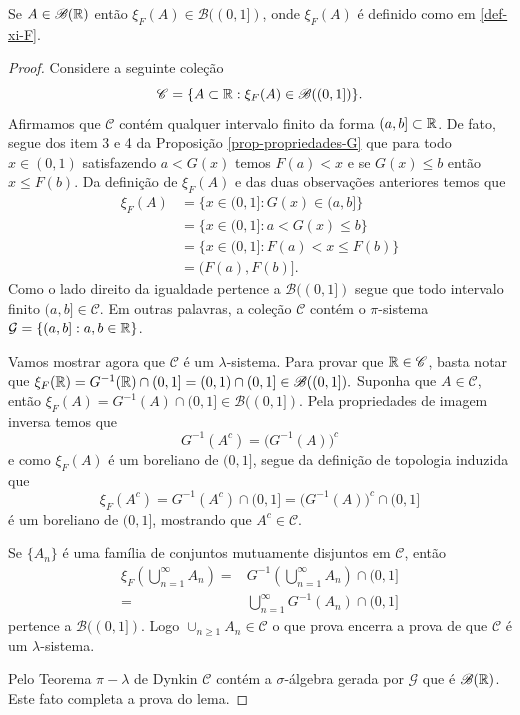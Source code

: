 \begin{lema}
	Se $A\in\mathscr{B}(\mathbb{R})$ então $\xi_F(A) \in\mathscr{B}((0,1])$, onde
	$\xi_F(A)$ é definido como em \eqref{def-xi-F}.
\end{lema}



\begin{proof}
Considere a seguinte coleção 
	\[
		\mathscr{C} 
		=
		\{ A\subset\mathbb{R}: \xi_F(A) \in \mathscr{B}((0,1])\}.
	\]
Afirmamos que $\mathscr{C}$ contém qualquer intervalo finito da forma
$(a,b]\subset \mathbb{R}$. De fato, segue dos item 3 e 4 
da Proposição \ref{prop-propriedades-G} que 
para todo $x\in (0,1)$ satisfazendo 
$a<G(x)$ temos $F(a)<x$ e se $G(x)\leq b$ então 
$x\leq F(b)$. Da definição de $\xi_{F}(A)$ e 
das duas observações anteriores temos que
%
%
\begin{align*}
	\xi_F(A) 
	&= 
	\{ x\in (0,1]: G(x) \in (a,b] \}
	\\
	&=	
	\{ x\in (0,1]: a<G(x)\leq b  \}
	\\
	&=
	\{ x\in (0,1]:F(a) <x \leq F(b) \}
	\\
	&=
	(F(a),F(b)].
\end{align*}
Como o lado direito da igualdade pertence a $\mathscr{B}((0,1])$
segue que todo intervalo finito $(a,b]\in \mathscr{C}$.
Em outras palavras, a coleção $\mathscr{C}$ 
contém o $\pi$-sistema $\mathcal{G}=\{ (a,b]: a,b\in\mathbb{R}\}$.


Vamos mostrar agora que $\mathscr{C}$ é um $\lambda$-sistema. 
Para provar que $\mathbb{R}\in \mathscr{C}$, basta 
notar que
$
	\xi_F(\mathbb{R})
	= G^{-1}(\mathbb{R})\cap (0,1] 
	= (0,1)\cap (0,1]
	\in \mathscr{B}((0,1]). 
$
Suponha que $A\in\mathscr{C}$, então 
$\xi_F(A)=G^{-1}(A)\cap (0,1]\in \mathscr{B}((0,1])$.
Pela propriedades de imagem inversa temos que 
\[
	G^{-1}(A^c)= \Big(G^{-1}(A)\Big)^c
\]
e como $\xi_F(A)$ é um boreliano de $(0,1]$, segue da definição 
de topologia induzida que 
	\[
		\xi_F(A^c)
		=
		G^{-1}(A^c)\cap (0,1]
		= 
		\Big(G^{-1}(A)\Big)^c\cap (0,1]		
	\]
é um boreliano de $(0,1]$, mostrando que $A^c\in\mathscr{C}$.

Se $\{A_n\}$ é uma família de 
conjuntos mutuamente disjuntos em $\mathscr{C}$,
então 
	\begin{align*}
	\xi_F\left( \bigcup_{n=1}^{\infty} A_n\right)
	=&
	G^{-1}\left( \bigcup_{n=1}^{\infty} A_n\right)\cap (0,1]
	\\
	=&
	\bigcup_{n=1}^{\infty} G^{-1}\left(A_n \right)\cap (0,1]
	\end{align*}
pertence a $\mathscr{B}((0,1])$. Logo $\cup_{n\geq 1} A_n\in \mathscr{C}$
o que prova encerra a prova de que $\mathscr{C}$ é um $\lambda$-sistema.

Pelo Teorema $\pi-\lambda$ de Dynkin $\mathscr{C}$ contém a $\sigma$-álgebra
gerada por $\mathcal{G}$ que é $\mathscr{B}(\mathbb{R})$. Este fato 
completa a prova do lema.
\end{proof}

